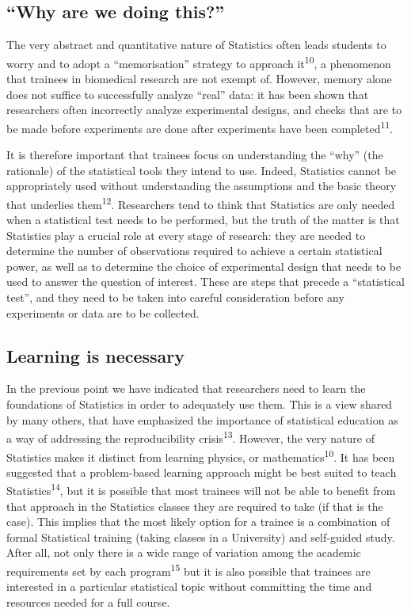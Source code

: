 \documentclass[smallextended]{svjour3}       %
\begin{document}
\hypertarget{why-are-we-doing-this}{%
\subsection{``Why are we doing this?''}\label{why-are-we-doing-this}}

The very abstract and quantitative nature of Statistics often leads
students to worry and to adopt a ``memorisation'' strategy to approach
it\textsuperscript{10}, a phenomenon that trainees in biomedical
research are not exempt of. However, memory alone does not suffice to
successfully analyze ``real'' data: it has been shown that researchers
often incorrectly analyze experimental designs, and checks that are to
be made before experiments are done after experiments have been
completed\textsuperscript{11}.

It is therefore important that trainees focus on understanding the
``why'' (the rationale) of the statistical tools they intend to use.
Indeed, Statistics cannot be appropriately used without understanding
the assumptions and the basic theory that underlies
them\textsuperscript{12}. Researchers tend to think that Statistics are
only needed when a statistical test needs to be performed, but the truth
of the matter is that Statistics play a crucial role at every stage of
research: they are needed to determine the number of observations
required to achieve a certain statistical power, as well as to determine
the choice of experimental design that needs to be used to answer the
question of interest. These are steps that precede a ``statistical
test'', and they need to be taken into careful consideration before any
experiments or data are to be collected.

\hypertarget{learning-is-necessary}{%
\subsection{Learning is necessary}\label{learning-is-necessary}}

In the previous point we have indicated that researchers need to learn
the foundations of Statistics in order to adequately use them. This is a
view shared by many others, that have emphasized the importance of
statistical education as a way of addressing the reproducibility
crisis\textsuperscript{13}. However, the very nature of Statistics makes
it distinct from learning physics, or mathematics\textsuperscript{10}.
It has been suggested that a problem-based learning approach might be
best suited to teach Statistics\textsuperscript{14}, but it is possible
that most trainees will not be able to benefit from that approach in the
Statistics classes they are required to take (if that is the case). This
implies that the most likely option for a trainee is a combination of
formal Statistical training (taking classes in a University) and
self-guided study. After all, not only there is a wide range of
variation among the academic requirements set by each
program\textsuperscript{15} but it is also possible that trainees are
interested in a particular statistical topic without committing the time
and resources needed for a full course.
\end{document}
